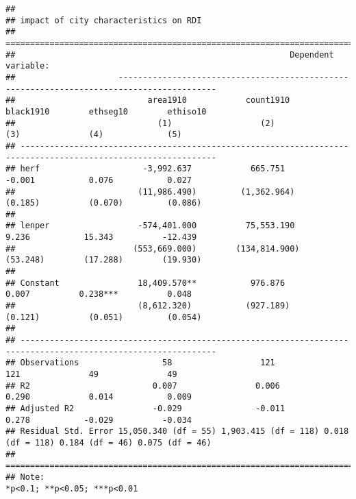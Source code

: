 \documentclass[
]{article}
\begin{document}
\begin{verbatim}
## 
## impact of city characteristics on RDI
## ==============================================================================================================
##                                                        Dependent variable:                                    
##                     ------------------------------------------------------------------------------------------
##                           area1910            count1910          black1910        ethseg10        ethiso10    
##                             (1)                  (2)                (3)              (4)             (5)      
## --------------------------------------------------------------------------------------------------------------
## herf                     -3,992.637            665.751             -0.001           0.076           0.027     
##                         (11,986.490)         (1,362.964)          (0.185)          (0.070)         (0.086)    
##                                                                                                               
## lenper                  -574,401.000          75,553.190           9.236           15.343          -12.439    
##                        (553,669.000)        (134,814.900)         (53.248)        (17.288)        (19.930)    
##                                                                                                               
## Constant                18,409.570**           976.876             0.007          0.238***          0.048     
##                         (8,612.320)           (927.189)           (0.121)          (0.051)         (0.054)    
##                                                                                                               
## --------------------------------------------------------------------------------------------------------------
## Observations                 58                  121                121              49              49       
## R2                         0.007                0.006              0.290            0.014           0.009     
## Adjusted R2                -0.029               -0.011             0.278           -0.029          -0.034     
## Residual Std. Error 15,050.340 (df = 55) 1,903.415 (df = 118) 0.018 (df = 118) 0.184 (df = 46) 0.075 (df = 46)
## ==============================================================================================================
## Note:                                                                              *p<0.1; **p<0.05; ***p<0.01
\end{verbatim}
\end{document}
